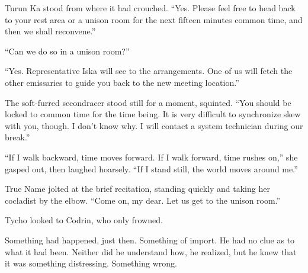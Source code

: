Turun Ka stood from where it had crouched. ``Yes. Please feel free to head back to your rest area or a unison room for the next fifteen minutes common time, and then we shall reconvene.''

``Can we do so in a unison room?''

``Yes. Representative Iska will see to the arrangements. One of us will fetch the other emissaries to guide you back to the new meeting location.''

The soft-furred secondracer stood still for a moment, squinted. ``You should be locked to common time for the time being. It is very difficult to synchronize skew with you, though. I don't know why. I will contact a system technician during our break.''

``If I walk backward, time moves forward. If I walk forward, time rushes on,'' she gasped out, then laughed hoarsely. ``If I stand still, the world moves around me.''

True Name jolted at the brief recitation, standing quickly and taking her cocladist by the elbow. ``Come on, my dear. Let us get to the unison room.''

Tycho looked to Codrin, who only frowned.

Something had happened, just then. Something of import. He had no clue as to what it had been. Neither did he understand how, he realized, but he knew that it was something distressing. Something wrong.
